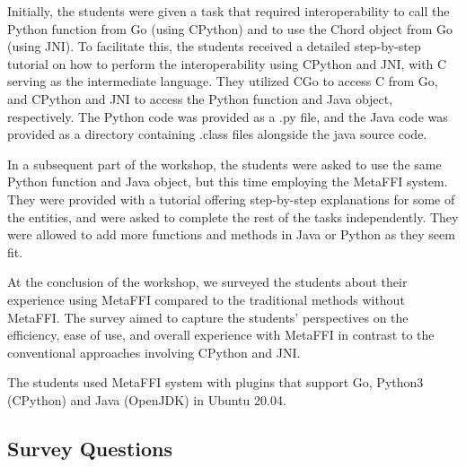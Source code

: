 \documentclass[sigplan,10pt,manuscript,nonacm]{acmart}
\begin{document}
Initially, the students were given a task that required interoperability to call the Python function from Go (using CPython) and to use the Chord object from Go (using JNI). To facilitate this, the students received a detailed step-by-step tutorial on how to perform the interoperability using CPython and JNI, with C serving as the intermediate language. They utilized CGo to access C from Go, and CPython and JNI to access the Python function and Java object, respectively. The Python code was provided as a .py file, and the Java code was provided as a directory containing .class files alongside the java source code.

In a subsequent part of the workshop, the students were asked to use the same Python function and Java object, but this time employing the MetaFFI system. They were provided with a tutorial offering step-by-step explanations for some of the entities, and were asked to complete the rest of the tasks independently. They were allowed to add more functions and methods in Java or Python as they seem fit.

At the conclusion of the workshop, we surveyed the students about their experience using MetaFFI compared to the traditional methods without MetaFFI. The survey aimed to capture the students' perspectives on the efficiency, ease of use, and overall experience with MetaFFI in contrast to the conventional approaches involving CPython and JNI.

The students used MetaFFI system with plugins that support Go, Python3 (CPython) and Java (OpenJDK) in Ubuntu 20.04.


\subsection{Survey Questions}
\end{document}
